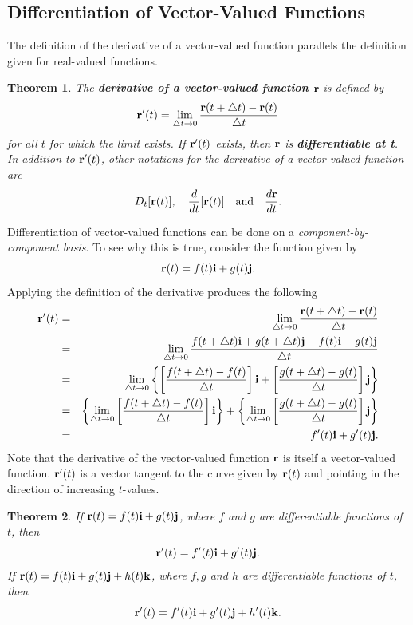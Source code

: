\documentclass[titlepage,a4paper,12pt]{report}
\newtheorem{theorem}{Theorem}[section]
\begin{document}
\subsection{Differentiation of Vector-Valued Functions}
The definition of the derivative of a vector-valued function parallels the definition given for real-valued functions.
\begin{theorem}
The \textbf{derivative of a vector-valued function ${\bf{r}}$} is defined by 
\[{\bf{r}}'(t)=\lim _{\bigtriangleup t \rightarrow 0}\dfrac{{\bf{r}}(t+\bigtriangleup t)-{\bf{r}}(t)}{\bigtriangleup t }\] for all $t$ for which the limit exists. If ${\bf{r}}'(t)$ exists, then ${\bf{r}}$ is \textbf{differentiable at t}. In addition to ${\bf{r}}'(t)$, other notations for the derivative of a vector-valued function are 
\[D_t[{\bf{r}}(t)], \quad \dfrac{d}{dt}[{\bf{r}}(t)] \quad \mbox{and} \quad \dfrac{d{\bf{r}}}{dt}.\]
\end{theorem}
\noindent Differentiation of vector-valued functions can be done on a \textit{component-by-component basis}. To see why this is true, consider the function given by
\[{\bf{r}}(t)=f(t){\bf{i}}+g(t){\bf{j}}.\]
Applying the definition of the derivative produces the following 
\begin{eqnarray*}
{\bf{r}}'(t) &=& \lim _{\bigtriangleup t \rightarrow 0}\dfrac{{\bf{r}}(t+\bigtriangleup t)-{\bf{r}}(t)}{\bigtriangleup t }\\
&=& \lim _{\bigtriangleup t \rightarrow 0} \dfrac{f(t+\bigtriangleup t){\bf{i}}+g(t+\bigtriangleup t){\bf{j}}-f(t){\bf{i}}-g(t){\bf{j}}}{\bigtriangleup t}\\
&=& \lim _{\bigtriangleup t \rightarrow 0} \left \{ \left[ \dfrac{f(t+\bigtriangleup t)-f(t)}{\bigtriangleup t}\right]{\bf{i}}+\left[\dfrac{g(t+\bigtriangleup t)-g(t)}{\bigtriangleup t}\right]{\bf{j}}\right \}\\
&=& \left \{\lim _{\bigtriangleup t\rightarrow 0} \left[ \dfrac{f(t+\bigtriangleup t)-f(t)}{\bigtriangleup t}\right]{\bf{i}}\right \}+\left \{\lim _{\bigtriangleup t\rightarrow 0}\left[\dfrac{g(t+\bigtriangleup t)-g(t)}{\bigtriangleup t}\right]{\bf{j}}\right \}\\
&=& f'(t){\bf{i}}+g'(t){\bf{j}}.
\end{eqnarray*}
Note that the derivative of the vector-valued function ${\bf{r}}$ is itself a vector-valued function. ${\bf{r}}'(t)$ is a vector tangent to the curve given by ${\bf{r}}(t)$ and pointing in the direction of increasing  $t$-values.
\begin{theorem}
If ${\bf{r}}(t)=f(t){\bf{i}}+g(t){\bf{j}}$, where $f$ and $g$ are differentiable functions of $t$, then 
\[{\bf{r}}'(t)=f'(t){\bf{i}}+g'(t){\bf{j}}.\]
If ${\bf{r}}(t)=f(t){\bf{i}}+g(t){\bf{j}}+h(t){\bf{k}}$, where $f,g$ and $h$ are differentiable functions of $t$, then 
\[{\bf{r}}'(t)=f'(t){\bf{i}}+g'(t){\bf{j}}+h'(t){\bf{k}}.\]
\end{theorem}
\end{document}
